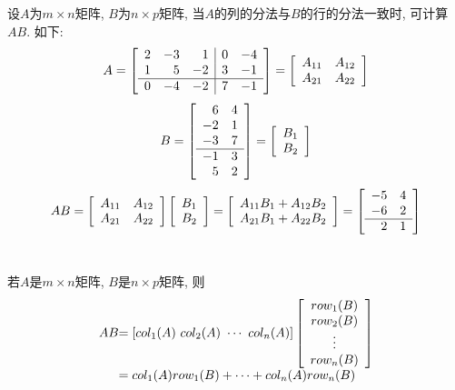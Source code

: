 设$A$为$m\times n$矩阵, $B$为$n\times p$矩阵, 当$A$的列的分法与$B$的行的分法一致时, 可计算$AB$. 如下:
\[A=\left[\begin{array}{r r r|r r}
2 & -3 & 1 & 0 & -4\\
1 & 5 & -2 & 3 & -1\\\hline
0 & -4 & -2 & 7 & -1
\end{array}\right]=
\left[\begin{array}{l l}
A_{11} & A_{12}\\
A_{21} & A_{22}
\end{array}\right]\]
\[B=\left[\begin{array}{r r}
6 & 4\\
-2 & 1\\
-3 & 7\\\hline
-1 & 3\\
5 & 2
\end{array}\right]=
\left[\begin{array}{l}
B_1\\
B_2
\end{array}\right]\]
\[AB=\left[
\begin{array}{l l}
A_{11} & A_{12}\\
A_{21} & A_{22}
\end{array}
\right]\left[
\begin{array}{l}
B_1\\
B_2
\end{array}
\right]=\left[
\begin{array}{l}
A_{11}B_1+A_{12}B_2\\
A_{21}B_1+A_{22}B_2
\end{array}
\right]=\left[
\begin{array}{r r}
-5 & 4\\
-6 & 2\\\hline
2 & 1
\end{array}
\right]\]\\[2ex]

\begin{TheoremTwo}[$AB$的列行展开]
若$A$是$m\times n$矩阵, $B$是$n\times p$矩阵, 则
\[\begin{array}{l@{}l}
AB & =[col_1(A)\ col_2(A)\ \cdots\ col_n(A)]\left[
\begin{array}{c}
row_1(B)\\
row_2(B)\\
\vdots\\
row_n(B)
\end{array}
\right]\\
& =col_1(A)row_1(B)+\cdots+col_n(A)row_n(B)
\end{array}\]
\end{TheoremTwo}\vspace{4ex}

